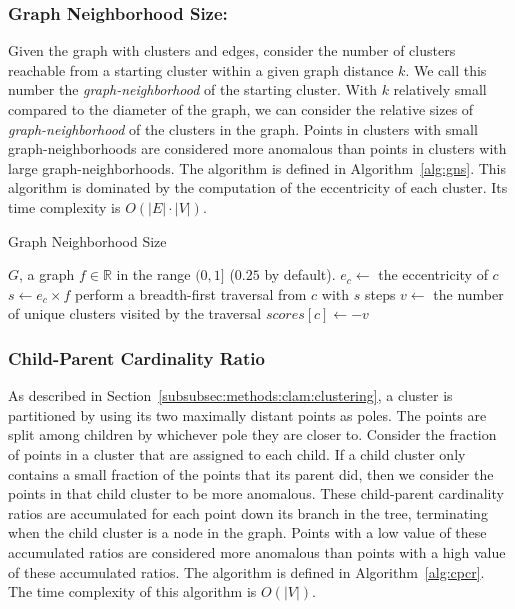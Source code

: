 \subsubsection{Graph Neighborhood Size:}
Given the graph with clusters and edges, consider the number of clusters reachable from a starting cluster within a given graph distance $k$.
We call this number the \textit{graph-neighborhood} of the starting cluster.
With $k$ relatively small compared to the diameter of the graph, we can consider the relative sizes of \textit{graph-neighborhood} of the clusters in the graph.
Points in clusters with small graph-neighborhoods are considered more anomalous than points in clusters with large graph-neighborhoods. The algorithm is defined in Algorithm~\ref{alg:gns}.
This algorithm is dominated by the computation of the eccentricity of each cluster.
Its time complexity is $O(|E| \cdot |V|)$.


\begin{algorithm}[h]
    \caption{Graph Neighborhood Size}
    \label{alg:gns}
\begin{algorithmic}[1]
    \Require $G$, a graph
    \Require $f \in \mathbb{R}$ in the range $(0,1]$ ($0.25$ by default).
        \State $e_c \gets$ the eccentricity of $c$
        \State $s \gets e_c \times f$
        \State perform a breadth-first traversal from $c$ with $s$ steps
        \State $v \gets$ the number of unique clusters visited by the traversal
        \State $scores[c] \gets -v$
    \EndFor
\end{algorithmic}
\end{algorithm}



\subsubsection{Child-Parent Cardinality Ratio}
As described in Section~\ref{subsubsec:methods:clam:clustering}, a cluster is partitioned by using its two maximally distant points as poles.
The points are split among children by whichever pole they are closer to.
Consider the fraction of points in a cluster that are assigned to each child.
If a child cluster only contains a small fraction of the points that its parent did, then we consider the points in that child cluster to be more anomalous.
These child-parent cardinality ratios are accumulated for each point down its branch in the tree, terminating when the child cluster is a node in the graph.
Points with a low value of these accumulated ratios are considered more anomalous than points with a high value of these accumulated ratios. The algorithm is defined in Algorithm~\ref{alg:cpcr}. The time complexity of this algorithm is $O(|V|)$.

